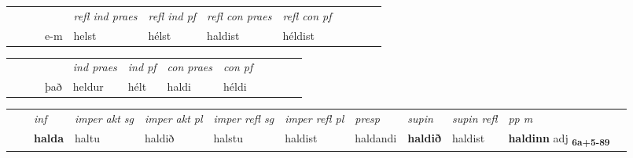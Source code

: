 \begin{tabular}{llllllllllll}
 & &  & &  \textit{refl ind praes} & \textit{refl ind pf} & \textit{refl con praes} & \textit{refl con pf} \\*
&  & & e-m & helst & hélst & haldist & héldist \\*
\cmidrule{5-9}
\end{tabular}


\begin{tabular}{llllllllllll}
 & &  & &  \textit{ind praes} & \textit{ind pf} & \textit{con praes} & \textit{con pf} \\*
&  & & það & heldur & hélt & haldi & héldi \\*
\cmidrule{5-9}
\end{tabular}


\begin{tabular}{llllllllllll}
 & & \textit{inf} & \textit{imper akt sg} & \textit{imper akt pl} & \textit{imper refl sg} & \textit{imper refl pl} & \textit{presp} & \textit{supin} & \textit{supin refl} & \textit{pp m}     \\*
  & & \textbf{halda} & haltu  & haldið & halstu & haldist & haldandi &  \textbf{haldið} & haldist & \textbf{haldinn} adj \textbf{\textsubscript{6a+5-89}} \\*
\cmidrule{1-12}
\end{tabular}



